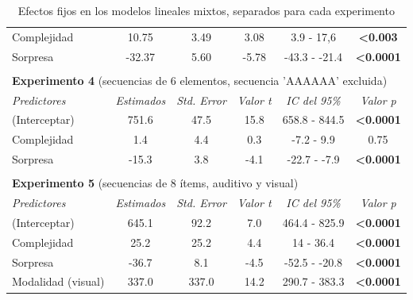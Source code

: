 \begin{table}[]
\begin{tabular}{lccccc}
Complejidad          & 10.75        & 3.49         & 3.08         & 3.9 - 17,6      & \textbf{\textless{}0.003} \\
Sorpresa           & -32.37        & 5.60         & -5.78        & -43.3 - -21.4    & \textbf{\textless{}0.0001} \\ \hline
\multicolumn{1}{c}{\textbf{}} & \multicolumn{1}{l}{} & \multicolumn{1}{l}{} & \multicolumn{1}{l}{} & \multicolumn{1}{l}{} & \multicolumn{1}{l}{}   \\
\multicolumn{6}{l}{\textbf{Experimento 4} (secuencias de 6 elementos, secuencia 'AAAAAA' excluida)}                          \\ \hline
\textit{Predictores}     & \textit{Estimados}  & \textit{Std. Error} & \textit{Valor t}   & \textit{IC del 95\%} & \textit{Valor p}       \\ \hline
(Interceptar)         & 751.6        & 47.5         & 15.8         & 658.8 - 844.5    & \textbf{\textless{}0.0001} \\
Complejidad          & 1.4         & 4.4         & 0.3         & -7.2 - 9.9      &0.75            \\
Sorpresa           & -15.3        & 3.8         & -4.1         & -22.7 - -7.9     & \textbf{\textless{}0.0001} \\ \hline
\multicolumn{1}{c}{\textbf{}} & \multicolumn{1}{l}{} & \multicolumn{1}{l}{} & \multicolumn{1}{l}{} & \multicolumn{1}{l}{} & \multicolumn{1}{l}{}   \\
\multicolumn{6}{l}{\textbf{Experimento 5} (secuencias de 8 ítems, auditivo y visual)}                                 \\ \hline
\textit{Predictores}     & \textit{Estimados}  & \textit{Std. Error} & \textit{Valor t}   & \textit{IC del 95\%} & \textit{Valor p}       \\ \hline
(Interceptar)         & 645.1        & 92.2         & 7.0         & 464.4 - 825.9    & \textbf{\textless{}0.0001} \\
Complejidad          & 25.2         & 25.2         & 4.4         & 14 - 36.4      & \textbf{\textless{}0.0001} \\
Sorpresa           & -36.7        & 8.1         & -4.5         & -52.5 - -20.8    & \textbf{\textless{}0.0001} \\
Modalidad (visual)      & 337.0        & 337.0        & 14.2         & 290.7 - 383.3    & \textbf{\textless{}0.0001} \\ \hline
\end{tabular}
\caption{Efectos fijos en los modelos lineales mixtos, separados para cada experimento}
\label{PlosBIO-T1}
\end{table}

